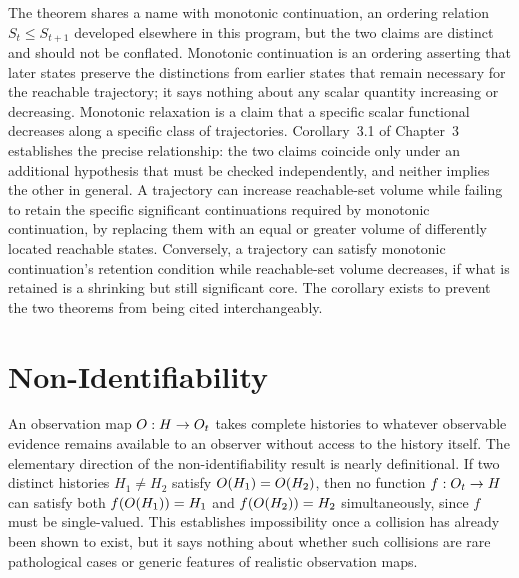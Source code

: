 The theorem shares a name with monotonic continuation, an ordering relation $S_t \le S_{t+1}$ developed elsewhere in this program, but the two claims are distinct and should not be conflated. Monotonic continuation is an ordering asserting that later states preserve the distinctions from earlier states that remain necessary for the reachable trajectory; it says nothing about any scalar quantity increasing or decreasing. Monotonic relaxation is a claim that a specific scalar functional decreases along a specific class of trajectories. Corollary~3.1 of Chapter~3 establishes the precise relationship: the two claims coincide only under an additional hypothesis that must be checked independently, and neither implies the other in general. A trajectory can increase reachable-set volume while failing to retain the specific significant continuations required by monotonic continuation, by replacing them with an equal or greater volume of differently located reachable states. Conversely, a trajectory can satisfy monotonic continuation's retention condition while reachable-set volume decreases, if what is retained is a shrinking but still significant core. The corollary exists to prevent the two theorems from being cited interchangeably.

\section{Non-Identifiability}

An observation map $O : H \to O_t$ takes complete histories to whatever observable evidence remains available to an observer without access to the history itself. The elementary direction of the non-identifiability result is nearly definitional. If two distinct histories $H_1 \neq H_2$ satisfy $O(H_1) = O(H_2)$, then no function $f : O_t \to H$ can satisfy both $f(O(H_1)) = H_1$ and $f(O(H_2)) = H_2$ simultaneously, since $f$ must be single-valued. This establishes impossibility once a collision has already been shown to exist, but it says nothing about whether such collisions are rare pathological cases or generic features of realistic observation maps.

